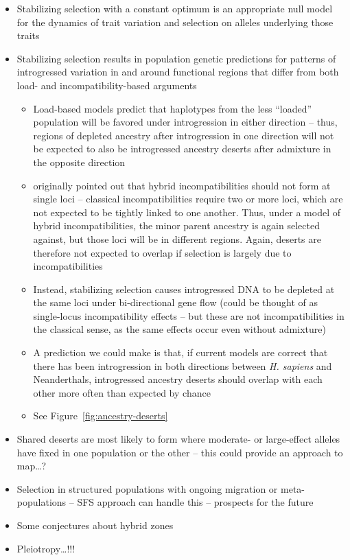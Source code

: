 \documentclass{article}
\begin{document}
\begin{itemize}
    \item Stabilizing selection with a constant optimum is an appropriate
        null model for the dynamics of trait variation and selection on
        alleles underlying those traits
    \item Stabilizing selection results in population genetic predictions
        for patterns of introgressed variation in and around functional
        regions that differ from both load- and incompatibility-based arguments
        \begin{itemize}
            \item Load-based models predict that haplotypes from the less ``loaded''
                population will be favored under introgression in either direction
                -- thus, regions of depleted ancestry after introgression in one
                direction will not be expected to also be introgressed ancestry
                deserts after admixture in the opposite direction
            \item \citet{mueller1942} originally pointed out that hybrid
                incompatibilities should not form at single loci -- classical
                incompatibilities require two or more loci, which are not
                expected to be tightly linked to one another. Thus, under a
                model of hybrid incompatibilities, the minor parent ancestry
                is again selected against, but those loci will be in different
                regions. Again, deserts are therefore not expected to overlap
                if selection is largely due to incompatibilities
            \item Instead, stabilizing selection causes introgressed DNA to be
                depleted at the same loci under bi-directional gene flow
                (could be thought of as single-locus incompatibility effects --
                but these are not incompatibilities in the classical sense,
                as the same effects occur even without admixture)
            \item A prediction we could make is that, if current models are correct
                that there has been introgression in both directions between
                \emph{H. sapiens} and Neanderthals, introgressed ancestry deserts
                should overlap with each other more often than expected by chance
            \item See Figure~\ref{fig:ancestry-deserts}
        \end{itemize}
    \item Shared deserts are most likely to form where moderate- or large-effect
        alleles have fixed in one population or the other -- this could provide
        an approach to map\dots?
    \item Selection in structured populations with ongoing migration or
        meta-populations -- SFS approach can handle this -- prospects for the
        future
    \item Some conjectures about hybrid zones
    \item Pleiotropy\dots!!!
\end{itemize}
\end{document}
